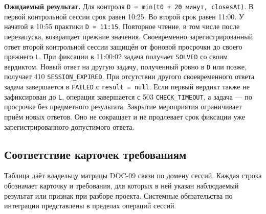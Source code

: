 \documentclass[12pt,a4paper]{article}
\begin{document}
\textbf{Ожидаемый результат.} Для контроля \texttt{D =\allowbreak{} min(t0 + 20 минут, closes\allowbreak{}At)}. В первой контрольной сессии срок равен 10:25. Во второй срок равен 11:00. У начатой в 10:55 практики \texttt{D\ =\ 11:15}. Повторное чтение, в том числе после перезапуска, возвращает прежние значения. Своевременно зарегистрированный ответ второй контрольной сессии защищён от фоновой просрочки до своего прежнего \texttt{L}. При фиксации в 11:00:02 задача получает \texttt{SOLVED} со своим вердиктом. Новый ответ на другую задачу, полученный ровно в \texttt{D} или позже, получает 410 \texttt{SESSION\_\allowbreak{}EXPIRED}. При отсутствии другого своевременного ответа задача завершается в \texttt{FAILED} с \texttt{result\ =\ null}. Если первый вердикт также не зафиксирован до \texttt{L}, операция завершается с 503 \texttt{CHECK\_\allowbreak{}TIMEOUT}, а задача --- по просрочке без предметного результата. Закрытие мероприятия ограничивает приём новых ответов. Оно не сокращает и не продлевает срок фиксации уже зарегистрированного допустимого ответа.

\subsection{Соответствие карточек требованиям}\label{ux441ux43eux43eux442ux432ux435ux442ux441ux442ux432ux438ux435-ux43aux430ux440ux442ux43eux447ux435ux43a-ux442ux440ux435ux431ux43eux432ux430ux43dux438ux44fux43c}

\hypertarget{соответствие-карточек-требованиям}{}

Таблица даёт владельцу матрицы DOC-09 связи по домену сессий. Каждая строка обозначает карточку и требования, для которых в ней указан наблюдаемый результат или признак при разборе проекта. Системные обязательства по интеграции представлены в пределах операций сессий.
\end{document}
